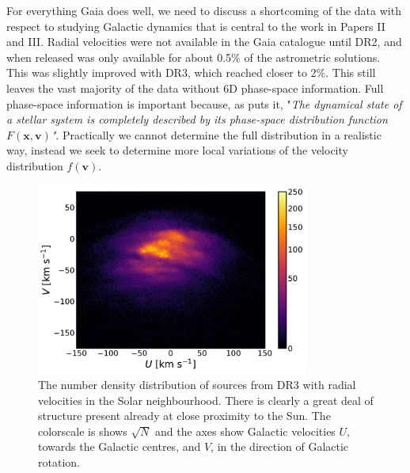 For everything Gaia does well, we need to discuss a shortcoming of the data with respect to studying Galactic dynamics that is central to the work in Papers II and III. Radial velocities were not available in the Gaia catalogue until DR2, and when released was only available for about 0.5\% of the astrometric solutions. This was slightly improved with DR3, which reached closer to 2\%. This still leaves the vast majority of the data without 6D phase-space information. Full phase-space information is important because, as \cite{dehnen:98a} puts it, "\textit{The dynamical state of a stellar system is completely described by its phase-space distribution function $F(\bm{x}, \bm{v})$"}. Practically we cannot determine the full distribution in a realistic way, instead we seek to determine more local variations of the velocity distribution $f(\bm{v})$. 
\begin{figure}[t]
    \centering
    \includegraphics[width=0.8\textwidth]{images/dr3veldist.pdf}
    \caption{The number density distribution of sources from DR3 with radial velocities in the Solar neighbourhood. There is clearly a great deal of structure present already at close proximity to the Sun. The colorscale is shows $\sqrt{N}$ and the axes show Galactic velocities $U$, towards the Galactic centres, and $V$, in the direction of Galactic rotation.} %
    \label{fig:veldist}
\end{figure}

